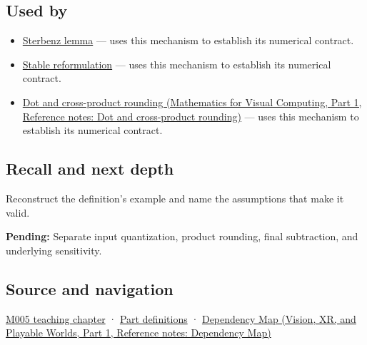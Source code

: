\subsection{Used by}\label{appendix-a2773a6a2f9d-used-by}

\hypertarget{appendix-a2773a6a2f9d-used-by}{}

\begin{itemize}
\tightlist
\item
  \hyperref[appendix-399b7ad53f39]{Sterbenz lemma} --- uses this mechanism to establish its numerical contract.
\item
  \hyperref[appendix-d7f8ba961670]{Stable reformulation} --- uses this mechanism to establish its numerical contract.
\item
  \href{../02-Mathematics-for-Visual-Computing-P01/main.pdf\#nameddest=appendix-5aef4f13483a}{Dot and cross-product rounding (Mathematics for Visual Computing, Part 1, Reference notes: Dot and cross-product rounding)} --- uses this mechanism to establish its numerical contract.
\end{itemize}

\subsection{Recall and next depth}\label{appendix-a2773a6a2f9d-recall-and-next-depth}

\hypertarget{appendix-a2773a6a2f9d-recall-and-next-depth}{}

Reconstruct the definition's example and name the assumptions that make it valid.

\textbf{Pending:} Separate input quantization, product rounding, final subtraction, and underlying sensitivity.

\subsection{Source and navigation}\label{appendix-a2773a6a2f9d-source-and-navigation}

\hypertarget{appendix-a2773a6a2f9d-source-and-navigation}{}

\hyperref[01-foundations-i-ch001-when-arithmetic-meets-uncertainty]{M005 teaching chapter} · \hyperref[appendix-fd090d982a15-m005---parts-77-88]{Part definitions} · \href{../07-Vision-XR-and-Playable-Worlds-P01/main.pdf\#nameddest=appendix-4ad47bdd269a}{Dependency Map (Vision, XR, and Playable Worlds, Part 1, Reference notes: Dependency Map)}

